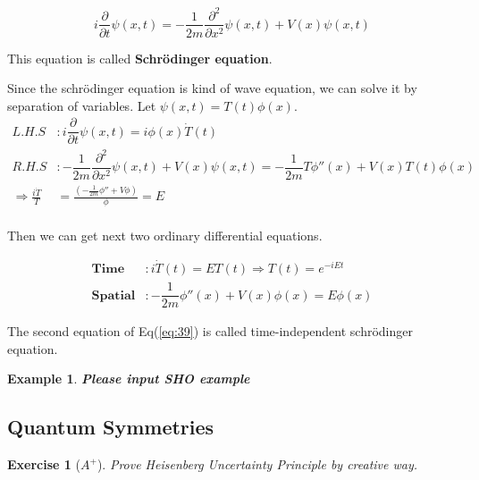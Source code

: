 \documentclass[final]{IEEEphot}
\newtheorem{example}{Example}[section]
\newtheorem{exercise}{Exercise}[section]
\newcommand{\PD}[2]{\dfrac{\partial #1}{\partial #2}} %
\newcommand{\PPD}[2]{\dfrac{\partial^2 #1}{\partial #2 ^2}}
\newcommand{\BKS}[1]{\left( #1 \right)} %
\newcommand{\VS}{\vspace{0.3cm}} %
\newcommand{\vs}{\vspace{0.1cm}} %
\begin{document}
\vs

\begin{equation}
 i\PD{}{t}\psi(x,t) = - \frac{1}{2m}\PPD{}{x} \psi(x,t) + V(x)\psi(x,t)
\end{equation}

\vs

This equation is called \textbf{Schr\"{o}dinger equation}.

\pagebreak

Since the schr\"{o}dinger equation is kind of wave equation, we can solve it by separation of variables.
Let $\psi(x,t) = T(t) \phi(x)$.
\begin{equation}
 \begin{split}
  L.H.S &: i\PD{}{t}\psi(x,t) = i\phi(x)\dot{T}(t) \\
  R.H.S &: -\dfrac{1}{2m} \PPD{}{x} \psi(x,t) +V(x)\psi(x,t) = -\dfrac{1}{2m}T\phi''(x)+V(x)T(t)\phi(x) \\
  \Rightarrow \frac{i\dot{T}}{T} &= \frac{\BKS{-\tfrac{1}{2m}\phi'' +V\phi}}{\phi} = E \\
 \end{split}
\end{equation}

\vs

Then we can get next two ordinary differential equations.

\begin{equation}
\label{eq:39}
 \begin{split}
  \textbf{Time} &: i\dot{T}(t) = ET(t) \Rightarrow T(t) = e^{-iEt} \\
  \textbf{Spatial} &: -\dfrac{1}{2m}\phi''(x) + V(x)\phi(x) = E\phi(x)
 \end{split}
\end{equation}

\vs

The second equation of Eq(\ref{eq:39}) is called time-independent schr\"{o}dinger equation.

\VS

\begin{example}
 \textbf{Please input SHO example}
\end{example}

\newpage

\subsection{Quantum Symmetries}

\VS

\begin{exercise}[$A^+$]
 Prove Heisenberg Uncertainty Principle by creative way.
\end{exercise}
\end{document}
